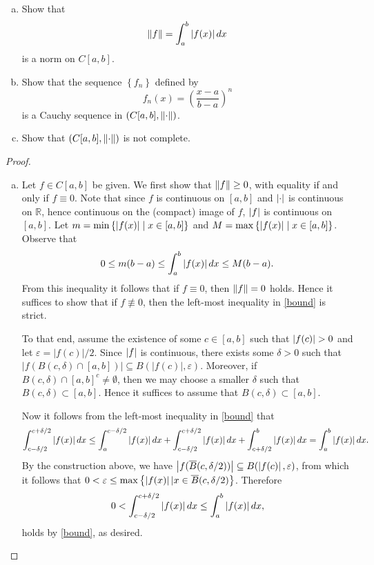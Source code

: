 \documentclass[10pt]{amsart}
\begin{document}
\begin{ex25}{}
  \begin{enumerate}[(a)]
  \item\label{25a}
    Show that 
    $$\lVert f\rVert = \int_a^b \left| f(x) \right|dx$$
    is a norm on $C[a,b]$.
  \item\label{25b}
    Show that the sequence $\left\{f_n\right\}$ defined by 
    $$f_n(x) = \left(\frac{x-a}{b-a}\right)^n$$
    is a Cauchy sequence in $(C[a,b], \lVert\cdot\rVert)$.
  \item\label{25c}
    Show that $(C[a,b], \lVert\cdot\rVert)$ is not complete.
  \end{enumerate}

  \begin{proof}
    \begin{enumerate}[(a)]
    \item
      Let $f \in C[a,b]$ be given.
      We first show that $\lVert f\rVert \geq 0$, with equality if and only if $f \equiv 0$.
      Note that since $f$ is continuous on $[a,b]$ and $\left| \cdot \right|$ is continuous on $\mathbb{R}$, hence continuous on the (compact) image of $f$, $\left| f \right|$ is continuous on $[a,b]$.
      Let $m = \min \left\{ \left| f(x) \right| \mid x \in [a,b] \right\}$ and $M = \max \left\{ \left| f(x) \right| \mid x \in [a,b] \right\}$.
      Observe that
      \begin{equation}\label{bound}
	0 \leq m(b-a) \leq \int_a^b \left| f(x) \right|dx \leq M(b-a).
      \end{equation}
      From this inequality it follows that if $f \equiv 0$, then $\lVert f\rVert = 0$ holds.
      Hence it suffices to show that if $f \not \equiv 0$, then the left-most inequality in \eqref{bound} is strict.

      To that end, assume the existence of some $c \in [a,b]$ such that $\left| f(c) \right| > 0$ and let $\varepsilon = |f(c)|/2$.
      Since $\left| f \right|$ is continuous, there exists some $\delta > 0$ such that $|f(B(c,\delta) \cap [a,b])| \subseteq B(|f(c)|,\varepsilon)$.
      Moreover, if $B(c,\delta) \cap [a,b]^c \not = \emptyset$, then we may choose a smaller $\delta$ such that $B(c,\delta) \subset [a,b]$.
      Hence it suffices to assume that $B(c,\delta) \subset [a,b]$.
      
      Now it follows from the left-most inequality in \eqref{bound} that
      $$\int_{c-\delta/2}^{c+\delta/2} \left| f(x) \right|dx \leq \int_a^{c-\delta/2} \left| f(x) \right|dx + \int_{c-\delta/2}^{c+\delta/2} \left| f(x) \right|dx + \int_{c+\delta/2}^b \left| f(x) \right|dx = \int_a^b \left| f(x) \right|dx.$$
      By the construction above, we have $\left| f(\overline{B}(c,\delta/2)) \right| \subseteq B(\left| f(c) \right|,\varepsilon)$, from which it follows that $0 < \varepsilon \leq \max \left\{\left| f(x) \right| | x \in \overline{B}(c,\delta/2) \right\}$.
      Therefore
      $$0 < \int_{c-\delta/2}^{c+\delta/2} \left| f(x) \right|dx \leq \int_a^b \left| f(x) \right|dx,$$
      holds by \eqref{bound}, as desired.
      

\end{enumerate}
\end{proof}
\end{ex25}
\end{document}
